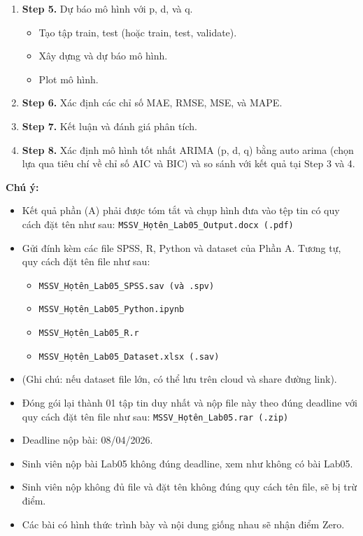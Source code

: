 \begin{enumerate}
    \item \textbf{Step 5.} Dự báo mô hình với p, d, và q.
    \begin{itemize}
        \item Tạo tập train, test (hoặc train, test, validate).
        \item Xây dựng và dự báo mô hình.
        \item Plot mô hình.
    \end{itemize}
    
    \item \textbf{Step 6.} Xác định các chỉ số MAE, RMSE, MSE, và MAPE.
    
    \item \textbf{Step 7.} Kết luận và đánh giá phân tích.
    
    \item \textbf{Step 8.} Xác định mô hình tốt nhất ARIMA (p, d, q) bằng auto arima (chọn lựa qua tiêu chí về chỉ số AIC và BIC) và so sánh với kết quả tại Step 3 và 4.
\end{enumerate}

\textbf{Chú ý:}

\begin{itemize}
    \renewcommand{\labelitemi}{-}
    
    \item Kết quả phần (A) phải được tóm tắt và chụp hình đưa vào tệp tin có quy cách đặt tên như sau: 
    \texttt{MSSV\_Họtên\_Lab05\_Output.docx (.pdf)}
    
    \item Gửi đính kèm các file SPSS, R, Python và dataset của Phần A. Tương tự, quy cách đặt tên file như sau:
    \begin{itemize}
        \renewcommand{\labelitemii}{$+$}
        \item \texttt{MSSV\_Họtên\_Lab05\_SPSS.sav (và .spv)}
        \item \texttt{MSSV\_Họtên\_Lab05\_Python.ipynb}
        \item \texttt{MSSV\_Họtên\_Lab05\_R.r}
        \item \texttt{MSSV\_Họtên\_Lab05\_Dataset.xlsx (.sav)}
    \end{itemize}
    \item (Ghi chú: nếu dataset file lớn, có thể lưu trên cloud và share đường link).
    
    \item Đóng gói lại thành 01 tập tin duy nhất và nộp file này theo đúng deadline với quy cách đặt tên file như sau: 
    \texttt{MSSV\_Họtên\_Lab05.rar (.zip)}
    
    \item Deadline nộp bài: 08/04/2026.
    
    \item Sinh viên nộp bài Lab05 không đúng deadline, xem như không có bài Lab05.
    
    \item Sinh viên nộp không đủ file và đặt tên không đúng quy cách tên file, sẽ bị trừ điểm.
    
    \item Các bài có hình thức trình bày và nội dung giống nhau sẽ nhận điểm Zero.
    
\end{itemize}